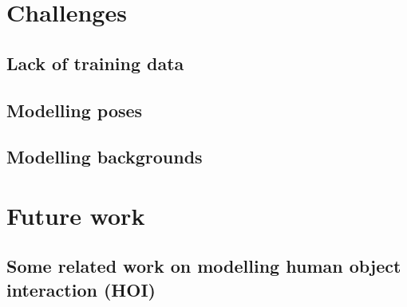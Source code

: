 \documentclass{article}
\begin{document}
\section{Challenges}

    \subsection{Lack of training data}
    
    \subsection{Modelling poses}
    
    \subsection{Modelling backgrounds}

\section{Future work}

\subsection{Some related work on modelling human object interaction (HOI)}



\end{document}

